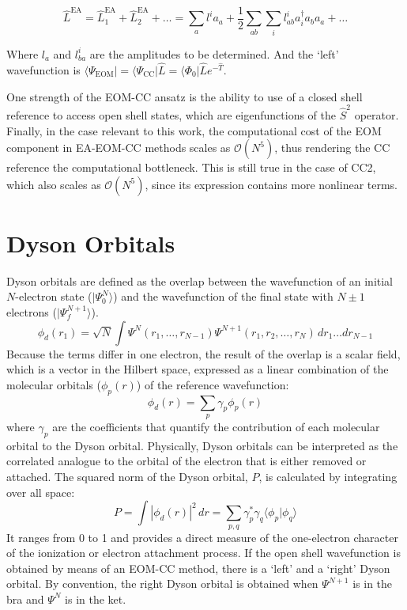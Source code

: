 \begin{equation}
\hat{L}^{\mathrm{EA}} = \hat{L}_1^{\mathrm{EA}} + \hat{L}_2^{\mathrm{EA}} + \ldots = \sum_{a} l^i a_a + \frac{1}{2}\sum_{ab} \sum_{i} l^{i}_{ab} a_i^{\dagger} a_b a_a + \ldots
\end{equation}

Where $l_a$ and $l_{ba}^{i}$ are the amplitudes to be determined. And the `left' wavefunction is $\langle\Psi_{\mathrm{EOM}}| = \langle\Psi_{\mathrm{CC}}| \hat{L} = \langle\Phi_0|\hat{L}e^{-\hat{T}}$.

One strength of the EOM-CC ansatz is the ability to use of a closed shell reference to access open shell states, which are eigenfunctions of the $\hat{S}^2$ operator. 
Finally, in the case relevant to this work, the computational cost of the EOM component in EA-EOM-CC methods scales as $\mathcal{O}(N^{5})$, thus rendering the CC reference the computational bottleneck. This is still true in the case of CC2, which also scales as $\mathcal{O}(N^{5})$, since its expression contains more nonlinear terms.

\section{Dyson Orbitals}

Dyson orbitals\cite{jagau2016characterizing,melania2007dyson} are defined as the overlap between the wavefunction of an initial $N$-electron state ($|\Psi_0^N\rangle$) and the wavefunction of the final state with $N\pm1$ electrons ($|\Psi_f^{N+1}\rangle$).
\begin{equation}
    \phi_{d}(r_1) = \sqrt{N} \int \Psi^{N}(r_1,\dots,r_{N-1}) \Psi^{N+1}(r_1, r_2,\dots,r_N)\,dr_1 \dots dr_{N-1}
\end{equation}
Because the terms differ in one electron, the result of the overlap is a scalar field, which is a vector in the Hilbert space, expressed as a linear combination of the molecular orbitals ($\phi_p(r)$) of the reference wavefunction:
\begin{equation}
    \phi_{d}(r) = \sum_p \gamma_p \phi_p(r)
\end{equation}
where $\gamma_p$ are the coefficients that quantify the contribution of each molecular orbital to the Dyson orbital. Physically, Dyson orbitals can be interpreted as the correlated analogue to the orbital of the electron that is either removed or attached. The squared norm of the Dyson orbital, $P$, is calculated by integrating over all space:
\begin{equation}
    P = \int |\phi_{d}(r)|^2 \,dr = \sum_{p,q} \gamma_p^* \gamma_q \langle \phi_p | \phi_q \rangle
\end{equation}
It ranges from 0 to 1 and provides a direct measure of the one-electron character of the ionization or electron attachment process. If the open shell wavefunction is obtained by means of an EOM-CC method, there is a `left' and a `right' Dyson orbital. By convention, the right Dyson orbital is obtained when $\Psi^{N+1}$ is in the bra and $\Psi^{N}$ is in the ket.\\

